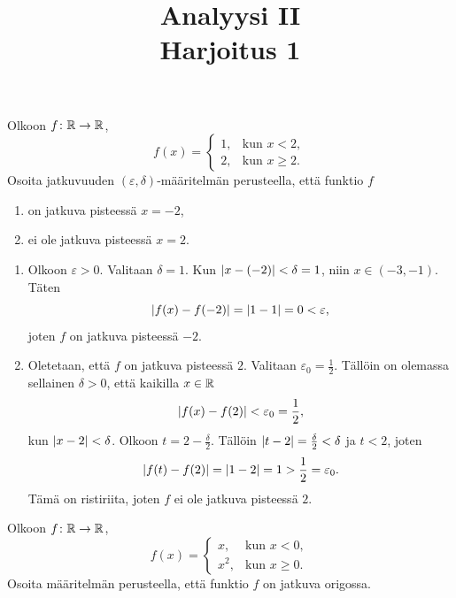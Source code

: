 \documentclass[11pt,a4paper]{amsart}
\title{Analyysi II\\Harjoitus 1}
\author{}
\date{}
\begin{document}

\begin{exercise}
  Olkoon \(f\colon \mathbb{R} \to \mathbb{R}\),
  \[
    f(x) =
    \begin{cases}
      1, & \text{kun } x < 2,\\
      2, & \text{kun } x \geqslant 2.
    \end{cases}
  \]
  Osoita jatkuvuuden \((\varepsilon,\delta)\)-määritelmän
  perusteella, että funktio \(f\)
  \begin{enumerate}[label=(\alph*), nosep]
    \item on jatkuva pisteessä \(x = -2\),
    \item ei ole jatkuva pisteessä \(x = 2\).
  \end{enumerate}
\end{exercise}

\begin{solution}
  \leavevmode\par
  \begin{enumerate}[label=(\alph*), nosep]
    \item Olkoon \(\varepsilon > 0\). Valitaan \(\delta = 1\). Kun
      \(\lvert x - (-2)\rvert < \delta = 1\), niin \(x \in (-3, -1)\). Täten
      \[
        \lvert f(x) - f(-2)\rvert = \lvert1 - 1\rvert = 0 < \varepsilon,
      \]
      joten \(f\) on jatkuva pisteessä \(-2\).
    \item Oletetaan, että \(f\) on jatkuva pisteessä \(2\).
      Valitaan \(\varepsilon_0 = \frac{1}{2}\). Tällöin on olemassa
      sellainen \(\delta > 0\), että kaikilla \(x \in \mathbb{R}\)
      \[
        \lvert f(x) - f(2)\rvert < \varepsilon_0 = \frac{1}{2},
      \]
      kun \(\lvert x - 2\rvert < \delta\). Olkoon \(t = 2 - \frac{\delta}{2}\). Tällöin
      \(\lvert t - 2\rvert = \frac{\delta}{2} < \delta\) ja \(t < 2\), joten
      \[
        \lvert f(t) - f(2)\rvert = \lvert1 - 2\rvert = 1 > \frac{1}{2} = \varepsilon_0.
      \]
      Tämä on ristiriita, joten \(f\) ei ole jatkuva pisteessä \(2\).
  \end{enumerate}
\end{solution}

\begin{exercise}
  Olkoon \(f\colon \mathbb{R} \to \mathbb{R}\),
  \[
    f(x) =
    \begin{cases}
      x, & \text{kun } x < 0,\\
      x^2, & \text{kun } x \geqslant 0.
    \end{cases}
  \]
  Osoita määritelmän perusteella, että funktio \(f\) on jatkuva origossa.
\end{exercise}
\end{document}
